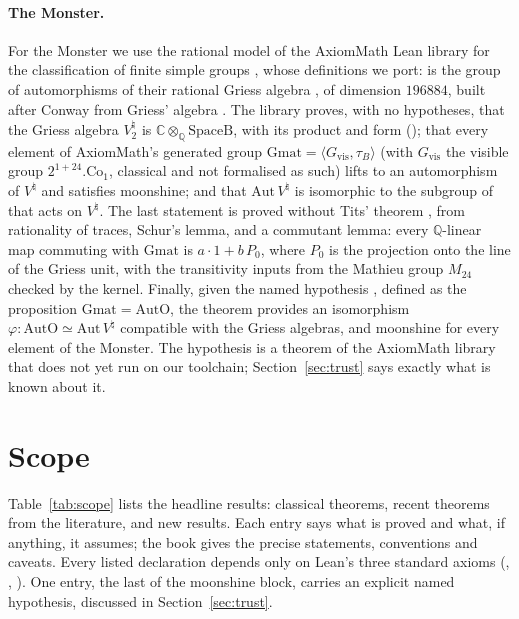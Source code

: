 \documentclass[10pt]{article}
\newcommand{\C}{\mathbb{C}}
\newcommand{\Vn}{V^\natural}
\begin{document}
\paragraph{The Monster.} For the Monster we use the rational model of the AxiomMath Lean library for the
classification of finite simple groups \cite{AxiomCFSG}, whose definitions we port:  is the group of
automorphisms of their rational Griess algebra , of dimension $196884$, built after Conway
\cite{Conway85} from Griess' algebra \cite{Griess}. The library proves, with no hypotheses, that the Griess algebra
$\Vn_2$ is $\C\otimes_{\mathbb Q}\mathrm{SpaceB}$, with its product and form (); that every element of AxiomMath's generated
group $\mathrm{Gmat}=\langle G_{\mathrm{vis}},\tau_B\rangle$ (with $G_{\mathrm{vis}}$ the visible group
$2^{1+24}.\mathrm{Co}_1$, classical and not formalised as such) lifts to an automorphism of $\Vn$ and satisfies
moonshine; and that $\mathrm{Aut}\,\Vn$ is isomorphic to the subgroup of  that acts on $\Vn$. The last
statement is proved without Tits' theorem \cite{Tits}, from rationality of traces, Schur's lemma, and a commutant
lemma: every $\mathbb Q$-linear map commuting with $\mathrm{Gmat}$ is $a\cdot1+b\,P_0$, where $P_0$ is the projection onto
the line of the Griess unit, with the transitivity inputs from the Mathieu group $M_{24}$ checked by the kernel. Finally, given
the named hypothesis , defined as the proposition $\mathrm{Gmat}=\mathrm{AutO}$, the theorem
 provides an isomorphism $\varphi:\mathrm{AutO}\simeq\mathrm{Aut}\,\Vn$ compatible with the
Griess algebras, and moonshine for every element of the Monster. The hypothesis is a theorem of the AxiomMath library
that does not yet run on our toolchain; Section~\ref{sec:trust} says exactly what is known about it.

\section{Scope}\label{sec:scope}

Table~\ref{tab:scope} lists the headline results: classical theorems, recent theorems from the literature, and
new results. Each entry says what is proved and what, if anything, it assumes; the book gives the precise statements,
conventions and caveats. Every listed declaration depends only on Lean's three standard axioms (,
, ). One entry, the last of the moonshine block, carries an explicit named
hypothesis, discussed in Section~\ref{sec:trust}.
\end{document}
